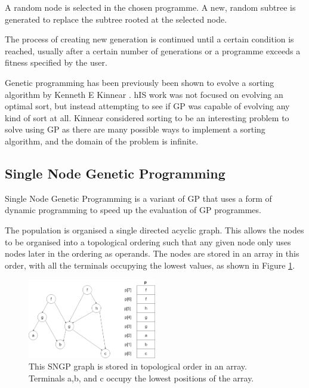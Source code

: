 \documentclass{article}
\begin{document}
\begin{itemize}
            A random node is selected in the chosen programme. A new, random subtree is generated to replace the subtree rooted at the selected node.
        \end{itemize}
        
        The process of creating new generation is continued until a certain condition is reached, usually after a certain number of generations or a programme exceeds a fitness specified by the user.
        
        Genetic programming has been previously been shown to evolve a sorting algorithm by Kenneth E Kinnear \cite{kinnear_generality_1993,kinnear_evolving_1993}. hIS work was not focused on evolving an optimal sort, but instead attempting to see if GP was capable of evolving any kind of sort at all. Kinnear considered sorting to be an interesting problem to solve using GP as there are many possible ways to implement a sorting algorithm, and the domain of the problem is infinite.
        
	\subsection{Single Node Genetic Programming}
	
        Single Node Genetic Programming is a variant of GP that uses a form of dynamic programming to speed up the evaluation of GP programmes.
        
        The population is organised a single directed acyclic graph. This allows the nodes to be organised into a topological ordering such that any given node only uses nodes later in the ordering as operands. The nodes are stored in an array in this order, with all the terminals occupying the lowest values, as shown in Figure \ref{fig:sngp_graph}.
        
        \begin{figure}[h]
            \centering
            \includegraphics[width=0.5\textwidth]{8_sngp_graph}
            \caption{This SNGP graph is stored in topological order in an array. Terminals a,b, and c occupy the lowest positions of the array.}
            \label{fig:sngp_graph}
        \end{figure}
        
\end{document}
